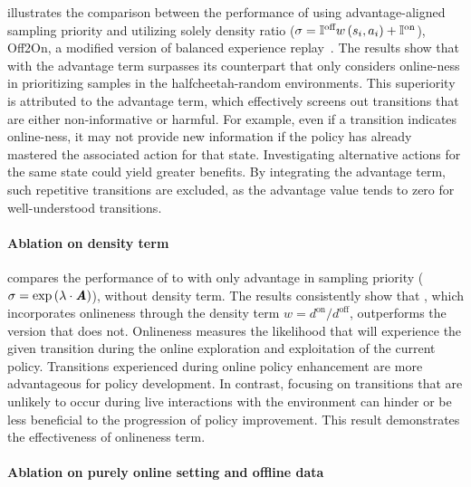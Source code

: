  illustrates the comparison between the performance of \algname using advantage-aligned sampling priority and \algname utilizing solely density ratio (${\sigma}=\mathbb{I}^{\text{off}}{w} \left( {s_i,a_i} \right) +\mathbb{I}^{\text{on}}$), Off2On, a modified version of balanced experience replay~\citep{lee2022offline}. The results show that \algname with the advantage term surpasses its counterpart that only considers online-ness in prioritizing samples in the halfcheetah-random environments. This superiority is attributed to the advantage term, which effectively screens out transitions that are either non-informative or harmful. For example, even if a transition indicates online-ness, it may not provide new information if the policy has already mastered the associated action for that state. Investigating alternative actions for the same state could yield greater benefits. By integrating the advantage term, such repetitive transitions are excluded, as the advantage value tends to zero for well-understood transitions.




\paragraph{Ablation on density term}

 compares the performance of \algname to \algname with only advantage in sampling priority (${\sigma}=\exp \left( {\lambda\cdot\textbf{\em A}} \right) $), without density term. The results consistently show that \algname, which incorporates onlineness through the density term $w = d^{\text{on}}/d^{\text{off}}$, outperforms the version that does not. Onlineness measures the likelihood that \algname will experience the given transition during the online exploration and exploitation of the current policy. Transitions experienced during online policy enhancement are more advantageous for policy development. In contrast, focusing on transitions that are unlikely to occur during live interactions with the environment can hinder or be less beneficial to the progression of policy improvement. This result demonstrates the effectiveness of onlineness term.










\paragraph{Ablation on purely online setting and offline data}





